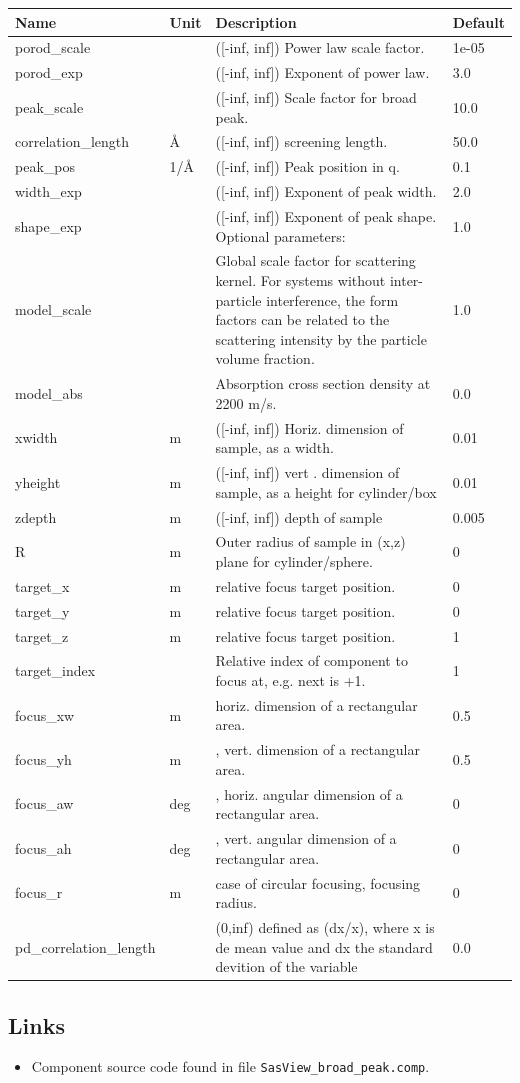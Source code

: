 \begin{longtable}{p{}p{}p{}p{}}
\toprule
\textbf{Name} & \textbf{Unit} & \textbf{Description} & \textbf{Default} \\
\midrule
\endhead
porod\_scale &  & ([-inf, inf]) Power law scale factor. & 1e-05 \\
porod\_exp &  & ([-inf, inf]) Exponent of power law. & 3.0 \\
peak\_scale &  & ([-inf, inf]) Scale factor for broad peak. & 10.0 \\
correlation\_length & \AA{} & ([-inf, inf]) screening length. & 50.0 \\
peak\_pos & 1/\AA{} & ([-inf, inf]) Peak position in q. & 0.1 \\
width\_exp &  & ([-inf, inf]) Exponent of peak width. & 2.0 \\
shape\_exp &  & ([-inf, inf]) Exponent of peak shape. Optional parameters: & 1.0 \\
model\_scale &   & Global scale factor for scattering kernel. For systems without inter-particle interference, the form factors can be related to the scattering intensity by the particle volume fraction. & 1.0 \\
model\_abs &   & Absorption cross section density at 2200 m/s. & 0.0 \\
xwidth & m & ([-inf, inf]) Horiz. dimension of sample, as a width. & 0.01 \\
yheight & m & ([-inf, inf]) vert . dimension of sample, as a height for cylinder/box & 0.01 \\
zdepth & m & ([-inf, inf]) depth of sample & 0.005 \\
R & m & Outer radius of sample in (x,z) plane for cylinder/sphere. & 0 \\
target\_x & m & relative focus target position. & 0 \\
target\_y & m & relative focus target position. & 0 \\
target\_z & m & relative focus target position. & 1 \\
target\_index &   & Relative index of component to focus at, e.g. next is +1. & 1 \\
focus\_xw & m & horiz. dimension of a rectangular area. & 0.5 \\
focus\_yh & m & , vert. dimension of a rectangular area. & 0.5 \\
focus\_aw & deg & , horiz. angular dimension of a rectangular area. & 0 \\
focus\_ah & deg & , vert. angular dimension of a rectangular area. & 0 \\
focus\_r & m & case of circular focusing, focusing radius. & 0 \\
pd\_correlation\_length &  & (0,inf) defined as (dx/x), where x is de mean value and dx the standard devition of the variable & 0.0 \\
\bottomrule
\end{longtable}

\subsection*{Links}
\begin{itemize}
  \item Component source code found in file \texttt{SasView\_broad\_peak.comp}.
\end{itemize}
